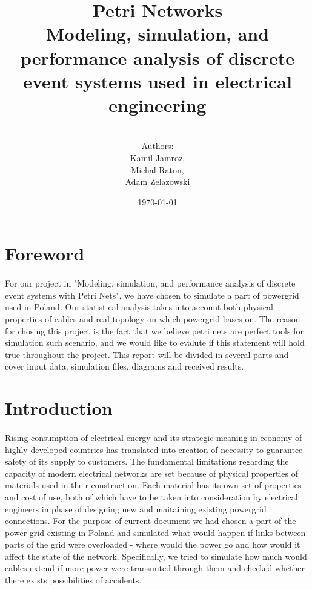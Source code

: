\documentclass[a4paper]{article}
\title{Petri Networks\\Modeling, simulation, and performance analysis of discrete event systems used in electrical engineering}
\author{\\Authors:\\ Kamil Jamroz,\\ Michal Raton,\\ Adam Zelazowski\\}
\date{\today}
\begin{document}
\maketitle

\clearpage

\tableofcontents

\clearpage

%
\section{Foreword}
\label{cha:foreword}
\paragraph{}
For our project in "Modeling, simulation, and performance analysis of discrete event systems with Petri Nets", we have chosen to simulate a part of powergrid used in Poland. Our statistical analysis takes into account both physical properties of cables and real topology on which powergrid bases on. The reason for chosing this project is the fact that we believe petri nets are perfect tools for simulation such scenario, and we would like to evalute if this statement will hold true throughout the project. This report will be divided in several parts and cover input data, simulation files, diagrams and received results.

%
\section{Introduction}  
\label{cha:introduction}
\paragraph{}
Rising consumption of electrical energy and its strategic meaning in economy of highly developed countries has translated into creation of necessity to guarantee safety of its supply to customers. The fundamental limitations regarding the capacity of modern electrical networks are set because of physical properties of materials used in their construction. Each material has its own set of properties and cost of use, both of which have to be taken into consideration by electrical engineers in phase of designing new and maitaining existing powergrid connections. For the purpose of current document we had chosen a part of the power grid existing in Poland and simulated what would happen if links between parts of the grid were overloaded - where would the power go and how would it affect the state of the network. Specifically, we tried to simulate how much would cables extend if more power were transmited through them and checked whether there exists possibilities of accidents.
\end{document}
